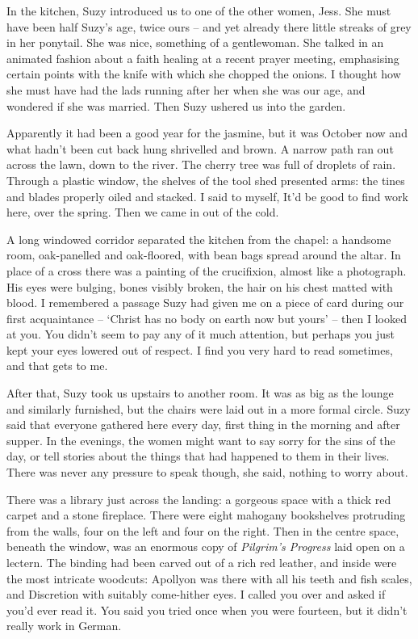 \documentclass{amsbook}
\begin{document}
In the kitchen, Suzy introduced us to one of the other women, Jess. She must have been half Suzy's age, twice ours -- and yet already there little streaks of grey in her ponytail. She was nice, something of a gentlewoman. She talked in an animated fashion about a faith healing at a recent prayer meeting, emphasising certain points with the knife with which she chopped the onions. I thought how she must have had the lads running after her when she was our age, and wondered if she was married. Then Suzy ushered us into the garden.

Apparently it had been a good year for the jasmine, but it was October now and what hadn't been cut back hung shrivelled and brown. A narrow path ran out across the lawn, down to the river. The cherry tree was full of droplets of rain. Through a plastic window, the shelves of the tool shed presented arms: the tines and blades properly oiled and stacked. I said to myself, It'd be good to find work here, over the spring. Then we came in out of the cold.

A long windowed corridor separated the kitchen from the chapel: a handsome room, oak-panelled and oak-floored, with bean bags spread around the altar. In place of a cross there was a painting of the crucifixion, almost like a photograph. His eyes were bulging, bones visibly broken, the hair on his chest matted with blood. I remembered a passage Suzy had given me on a piece of card during our first acquaintance -- `Christ has no body on earth now but yours' -- then I looked at you. You didn't seem to pay any of it much attention, but perhaps you just kept your eyes lowered out of respect. I find you very hard to read sometimes, and that gets to me.

After that, Suzy took us upstairs to another room. It was as big as the lounge and similarly furnished, but the chairs were laid out in a more formal circle. Suzy said that everyone gathered here every day, first thing in the morning and after supper. In the evenings, the women might want to say sorry for the sins of the day, or tell stories about the things that had happened to them in their lives. There was never any pressure to speak though, she said, nothing to worry about.

There was a library just across the landing: a gorgeous space with a thick red carpet and a stone fireplace. There were eight mahogany bookshelves protruding from the walls, four on the left and four on the right. Then in the centre space, beneath the window, was an enormous copy of \emph{Pilgrim's Progress} laid open on a lectern. The binding had been carved out of a rich red leather, and inside were the most intricate woodcuts: Apollyon was there with all his teeth and fish scales, and Discretion with suitably come-hither eyes. I called you over and asked if you'd ever read it. You said you tried once when you were fourteen, but it didn't really work in German.
\end{document}
